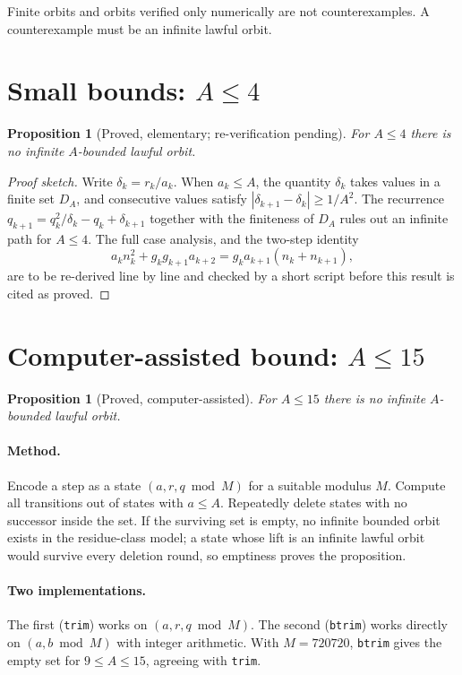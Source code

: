 \documentclass[11pt]{amsart}
\theoremstyle{plain}
\newtheorem{proposition}[theorem]{Proposition}
\theoremstyle{definition}
\theoremstyle{remark}
\begin{document}
Finite orbits and orbits verified only numerically are not counterexamples. A counterexample must be an infinite lawful orbit.

\section{Small bounds: $A\le 4$}\label{sec:small}

\begin{proposition}[Proved, elementary; re-verification pending]
For $A\le 4$ there is no infinite $A$-bounded lawful orbit.
\end{proposition}

\begin{proof}[Proof sketch]
Write $\delta_k=r_k/a_k$. When $a_k\le A$, the quantity $\delta_k$ takes values in a finite set $D_A$, and consecutive values satisfy $|\delta_{k+1}-\delta_k|\ge 1/A^2$. The recurrence $q_{k+1}=q_k^2/\delta_k-q_k+\delta_{k+1}$ together with the finiteness of $D_A$ rules out an infinite path for $A\le 4$. The full case analysis, and the two-step identity
\[
a_k n_k^2+g_kg_{k+1}a_{k+2}=g_k a_{k+1}(n_k+n_{k+1}),
\]
are to be re-derived line by line and checked by a short script before this result is cited as proved.
\end{proof}

\section{Computer-assisted bound: $A\le 15$}\label{sec:comp}

\begin{proposition}[Proved, computer-assisted]
For $A\le 15$ there is no infinite $A$-bounded lawful orbit.
\end{proposition}

\paragraph{Method.} Encode a step as a state $(a,r,q\bmod M)$ for a suitable modulus $M$. Compute all transitions out of states with $a\le A$. Repeatedly delete states with no successor inside the set. If the surviving set is empty, no infinite bounded orbit exists in the residue-class model; a state whose lift is an infinite lawful orbit would survive every deletion round, so emptiness proves the proposition.

\paragraph{Two implementations.} The first (\texttt{trim}) works on $(a,r,q\bmod M)$. The second (\texttt{btrim}) works directly on $(a,b\bmod M)$ with integer arithmetic. With $M=720720$, \texttt{btrim} gives the empty set for $9\le A\le 15$, agreeing with \texttt{trim}.
\end{document}
